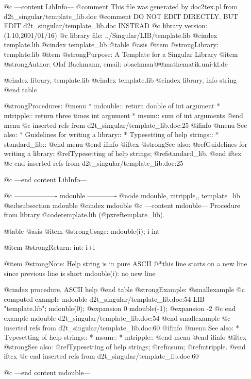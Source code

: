 @c ---content LibInfo---
@comment This file was generated by doc2tex.pl from d2t_singular/template_lib.doc
@comment DO NOT EDIT DIRECTLY, BUT EDIT d2t_singular/template_lib.doc INSTEAD
@c library version: (1.10,2001/01/16)
@c library file: ../Singular/LIB/template.lib
@cindex template.lib
@cindex template_lib
@table @asis
@item @strong{Library:}
template.lib
@item @strong{Purpose:}
  A Template for a Singular Library
@item @strong{Author:}
Olaf Bachmann, email: obachman@@mathematik.uni-kl.de

@cindex library, template.lib
@cindex template.lib
@cindex library, info string
@end table

@strong{Procedures:}
@menu
* mdouble:: return double of int argument
* mtripple:: return three times int argument
* msum:: sum of int arguments
@end menu
@c inserted refs from d2t_singular/template_lib.doc:25
@ifinfo
@menu
See also:
* Guidelines for writing a library::
* Typesetting of help strings::
* standard_lib::
@end menu
@end ifinfo
@iftex
@strong{See also:}
@ref{Guidelines for writing a library};
@ref{Typesetting of help strings};
@ref{standard_lib}.
@end iftex
@c end inserted refs from d2t_singular/template_lib.doc:25

@c ---end content LibInfo---

@c ------------------- mdouble -------------
@node mdouble, mtripple,, template_lib
@subsubsection mdouble
@cindex mdouble
@c ---content mdouble---
Procedure from library @code{template.lib} (@pxref{template_lib}).

@table @asis
@item @strong{Usage:}
mdouble(i); i int

@item @strong{Return:}
int: i+i

@item @strong{Note:}
Help string is in pure ASCII
@*this line starts on a new line since previous line is short
mdouble(i): no new line

@cindex procedure, ASCII help
@end table
@strong{Example:}
@smallexample
@c computed example mdouble d2t_singular/template_lib.doc:54 
LIB "template.lib";
mdouble(0);
@expansion{} 0
mdouble(-1);
@expansion{} -2
@c end example mdouble d2t_singular/template_lib.doc:54
@end smallexample
@c inserted refs from d2t_singular/template_lib.doc:60
@ifinfo
@menu
See also:
* Typesetting of help strings::
* msum::
* mtripple::
@end menu
@end ifinfo
@iftex
@strong{See also:}
@ref{Typesetting of help strings};
@ref{msum};
@ref{mtripple}.
@end iftex
@c end inserted refs from d2t_singular/template_lib.doc:60

@c ---end content mdouble---

